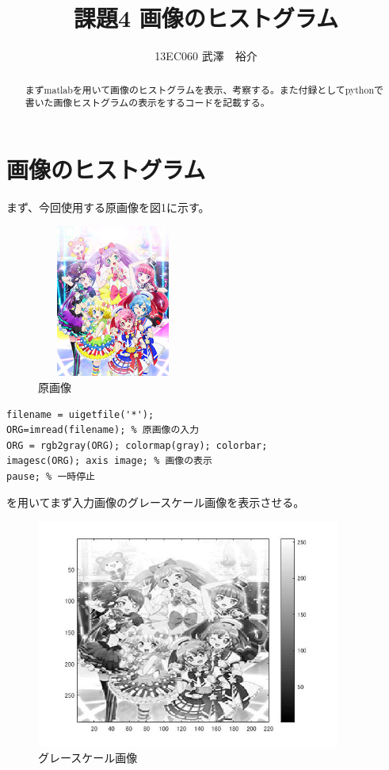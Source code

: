\documentclass{jsarticle}
\begin{document}
\title{課題4 画像のヒストグラム}
\author{13EC060 武澤　裕介}
\maketitle
\begin{abstract}
まずmatlabを用いて画像のヒストグラムを表示、考察する。また付録としてpythonで書いた画像ヒストグラムの表示をするコードを記載する。
\end{abstract}
\section{画像のヒストグラム}
まず、今回使用する原画像を図1に示す。


\begin{figure}[htbp]
 \begin{center}
  \includegraphics[width=5cm,height=5cm]{img_02.jpg}
 \end{center}
 \caption{原画像}
\end{figure}

\begin{lstlisting}[basicstyle=\ttfamily\footnotesize, frame=single]
filename = uigetfile('*');
ORG=imread(filename); % 原画像の入力
ORG = rgb2gray(ORG); colormap(gray); colorbar;
imagesc(ORG); axis image; % 画像の表示
pause; % 一時停止
 \end{lstlisting}
を用いてまず入力画像のグレースケール画像を表示させる。

\newpage
\begin{figure}[htbp]
 \begin{center}
  \includegraphics[width=10cm]{kadai4-0.jpg}
 \end{center}
 \caption{グレースケール画像}
\end{figure}
\end{document}

